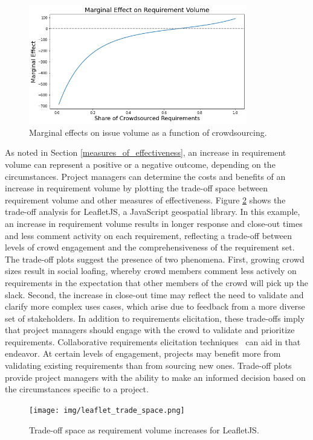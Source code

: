 \begin{figure}
  \includegraphics[width=0.85\textwidth]{img/issue_volume_marginal.PNG}
\caption{Marginal effects on issue volume as a function of crowdsourcing.}
\label{issue_volume_marginal}
\end{figure}

As noted in Section \ref{measures_of_effectiveness}, an increase in requirement volume can represent a positive or a negative outcome, depending on the circumstances. Project managers can determine the costs and benefits of an increase in requirement volume by plotting the trade-off space between requirement volume and other measures of effectiveness. Figure \ref{leaflet_trade_space} shows the trade-off analysis for LeafletJS, a JavaScript geospatial library. In this example, an increase in requirement volume results in longer response and close-out times and less comment activity on each requirement, reflecting a trade-off between levels of crowd engagement and the comprehensiveness of the requirement set. The trade-off plots suggest the presence of two phenomena. First, growing crowd sizes result in social loafing, whereby crowd members comment less actively on requirements in the expectation that other members of the crowd will pick up the slack. Second, the increase in close-out time may reflect the need to validate and clarify more complex uses cases, which arise due to feedback from a more diverse set of stakeholders. In addition to requirements elicitation, these trade-offs imply that project managers should engage with the crowd to validate and prioritize requirements. Collaborative requirements elicitation techniques~\cite{stakerare, mobasher} can aid in that endeavor. At certain levels of engagement, projects may benefit more from validating existing requirements than from sourcing new ones. Trade-off plots provide project managers with the ability to make an informed decision based on the circumstances specific to a project.

\begin{figure}
  \texttt{[image: img/leaflet\_trade\_space.png]}
\caption{Trade-off space as requirement volume increases for LeafletJS.}
\label{leaflet_trade_space}
\end{figure}